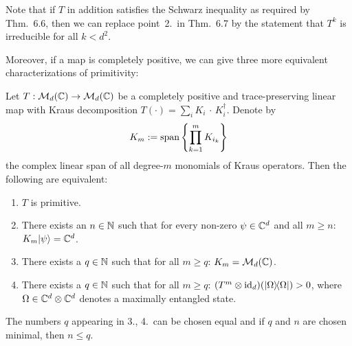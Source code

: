 \documentclass[11pt,a4paper]{article}
\theoremstyle{plain}
\theoremstyle{definition}
\theoremstyle{remark}
\begin{document}
Note that if $T$ in addition satisfies the Schwarz inequality as required by
Thm.~6.6, then we can replace point~2.\ in Thm.~6.7 by the statement that $T^k$
is irreducible for all $k<d^2$.

Moreover, if a map is completely positive, we can give three more equivalent
characterizations of primitivity:

\begin{theorem}
    Let $T:\mathcal{M}_d(\mathbb{C})\to\mathcal{M}_d(\mathbb{C})$ be a completely positive and trace-preserving
    linear map with Kraus decomposition $T(\cdot)=\sum_i K_i\,\cdot\,K_i^\dagger$.
    Denote by
    \[
        K_m := \operatorname{span}\left\{\prod_{k=1}^m K_{i_k}\right\}
    \]
    the complex linear span of all degree-$m$ monomials of Kraus operators. Then the
    following are equivalent:
    \begin{enumerate}
        \item $T$ is primitive.
        \item There exists an $n\in\mathbb{N}$ such that for every non-zero $\psi\in\mathbb{C}^d$ and
              all $m\ge n$: $K_m|\psi\rangle=\mathbb{C}^d$.
        \item There exists a $q\in\mathbb{N}$ such that for all $m\ge q$: $K_m=\mathcal{M}_d(\mathbb{C})$.
        \item There exists a $q\in\mathbb{N}$ such that for all $m\ge q$:
              $(T^m\otimes \mathrm{id}_d)(|\Omega\rangle\!\langle\Omega|)>0$, where
              $\Omega\in\mathbb{C}^d\otimes \mathbb{C}^d$ denotes a maximally entangled state.
    \end{enumerate}
    The numbers $q$ appearing in 3., 4.\ can be chosen equal and if $q$ and $n$ are
    chosen minimal, then $n\le q$.
\end{theorem}
\end{document}
